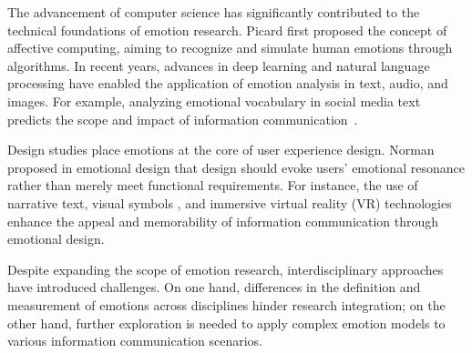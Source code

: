 The advancement of computer science has significantly contributed to the technical foundations of emotion research. Picard\cite{picard2000affective} first proposed the concept of affective computing, aiming to recognize and simulate human emotions through algorithms. In recent years, advances in deep learning and natural language processing have enabled the application of emotion analysis in text, audio, and images. For example, analyzing emotional vocabulary in social media text predicts the scope and impact of information communication~\cite{mohammad2013crowdsourcing}.

Design studies place emotions at the core of user experience design. Norman \cite{norman2007emotional} proposed in emotional design that design should evoke users’ emotional resonance rather than merely meet functional requirements. For instance, the use of narrative text\cite{mar2011emotion}, visual symbols \cite{mayer2014benefits}, and immersive virtual reality (VR) technologies \cite{slater2016enhancing} enhance the appeal and memorability of information communication through emotional design.

Despite expanding the scope of emotion research, interdisciplinary approaches have introduced challenges. On one hand, differences in the definition and measurement of emotions across disciplines hinder research integration; on the other hand, further exploration is needed to apply complex emotion models to various information communication scenarios.


